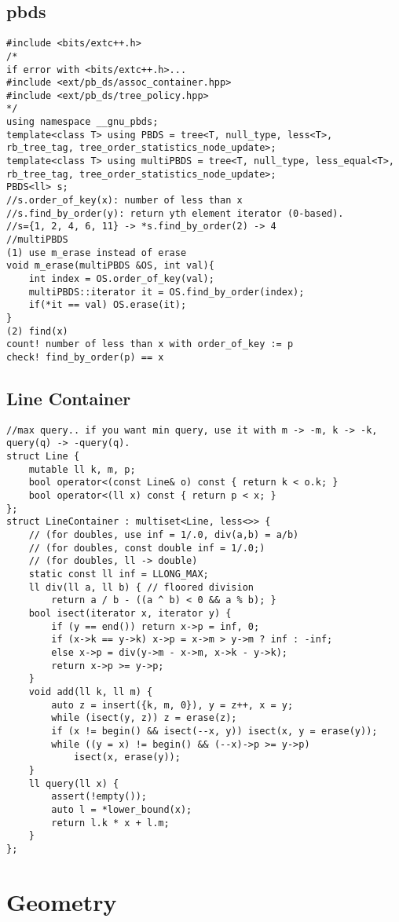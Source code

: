 \documentclass[landscape, 8pt, a4paper, oneside, twocolumn]{extarticle}
\begin{document}
\subsection {pbds}
\begin{verbatim}
#include <bits/extc++.h>
/*
if error with <bits/extc++.h>...
#include <ext/pb_ds/assoc_container.hpp>
#include <ext/pb_ds/tree_policy.hpp>
*/
using namespace __gnu_pbds;
template<class T> using PBDS = tree<T, null_type, less<T>, rb_tree_tag, tree_order_statistics_node_update>;
template<class T> using multiPBDS = tree<T, null_type, less_equal<T>, rb_tree_tag, tree_order_statistics_node_update>;
PBDS<ll> s;
//s.order_of_key(x): number of less than x
//s.find_by_order(y): return yth element iterator (0-based).
//s={1, 2, 4, 6, 11} -> *s.find_by_order(2) -> 4
//multiPBDS
(1) use m_erase instead of erase
void m_erase(multiPBDS &OS, int val){
    int index = OS.order_of_key(val);
    multiPBDS::iterator it = OS.find_by_order(index);
    if(*it == val) OS.erase(it);
}
(2) find(x)
count! number of less than x with order_of_key := p
check! find_by_order(p) == x
\end{verbatim}
\newpage
\subsection {Line Container}
\begin{verbatim}
//max query.. if you want min query, use it with m -> -m, k -> -k, query(q) -> -query(q).
struct Line {
	mutable ll k, m, p;
	bool operator<(const Line& o) const { return k < o.k; }
	bool operator<(ll x) const { return p < x; }
};
struct LineContainer : multiset<Line, less<>> {
	// (for doubles, use inf = 1/.0, div(a,b) = a/b)
	// (for doubles, const double inf = 1/.0;)
	// (for doubles, ll -> double)
	static const ll inf = LLONG_MAX;
	ll div(ll a, ll b) { // floored division
		return a / b - ((a ^ b) < 0 && a % b); }
	bool isect(iterator x, iterator y) {
		if (y == end()) return x->p = inf, 0;
		if (x->k == y->k) x->p = x->m > y->m ? inf : -inf;
		else x->p = div(y->m - x->m, x->k - y->k);
		return x->p >= y->p;
	}
	void add(ll k, ll m) {
		auto z = insert({k, m, 0}), y = z++, x = y;
		while (isect(y, z)) z = erase(z);
		if (x != begin() && isect(--x, y)) isect(x, y = erase(y));
		while ((y = x) != begin() && (--x)->p >= y->p)
			isect(x, erase(y));
	}
	ll query(ll x) {
		assert(!empty());
		auto l = *lower_bound(x);
		return l.k * x + l.m;
	}
};
\end{verbatim}
\newpage
\section{Geometry}
\end{document}
